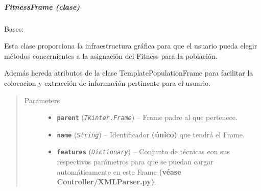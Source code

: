 \documentclass[letterpaper,10pt,english]{sphinxmanual}
\begin{document}
\subparagraph{FitnessFrame (clase)}
\label{View/Main/Population/TemplatePopulation/FitnessFrame:fitnessframe-clase}\label{View/Main/Population/TemplatePopulation/FitnessFrame:module-View.Main.Population.FitnessFrame}\label{View/Main/Population/TemplatePopulation/FitnessFrame::doc}

\begin{fulllineitems}
\label{View/Main/Population/TemplatePopulation/FitnessFrame:View.Main.Population.FitnessFrame.FitnessFrame}
Bases: {\hyperref[View/Main/Population/TemplatePopulation/TemplatePopulationFrame:View.Main.Population.TemplatePopulation.TemplatePopulationFrame.TemplatePopulationFrame]{}}

\begin{DUlineblock}{0em}
\item[] Esta clase proporciona la infraestructura gráfica para que el usuario pueda 
elegir métodos concernientes a la asignación del Fitness para la población.
\item[] Además hereda atributos de la clase TemplatePopulationFrame para facilitar
la colocacion y extracción de información pertinente para el usuario.
\end{DUlineblock}
\begin{quote}\begin{description}
\item[{Parameters}] \leavevmode\begin{itemize}
\item {} 
\textbf{\texttt{parent}} (\emph{\texttt{Tkinter.Frame}}) -- Frame padre al que pertenece.

\item {} 
\textbf{\texttt{name}} (\emph{\texttt{String}}) -- Identificador \textbf{(único)} que tendrá el Frame.

\item {} 
\textbf{\texttt{features}} (\emph{\texttt{Dictionary}}) -- Conjunto de técnicas con sus respectivos parámetros para que
se puedan cargar automáticamente en este Frame \textbf{(véase
Controller/XMLParser.py)}.

\end{itemize}


\end{description}
\end{quote}
\end{fulllineitems}
\end{document}
